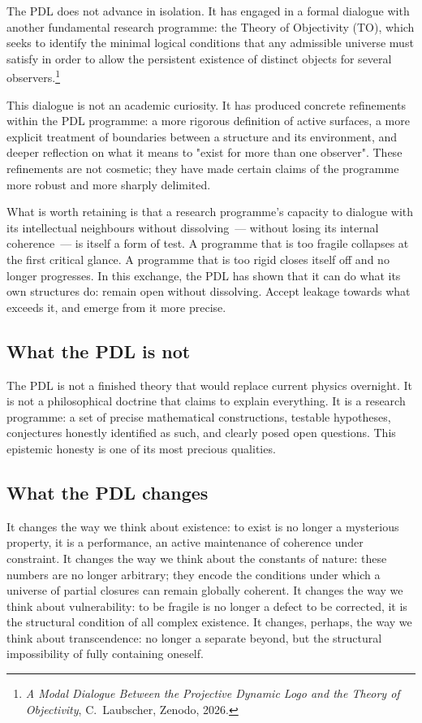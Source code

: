 \documentclass[12pt, a4paper, openright]{book}
\begin{document}
The PDL does not advance in isolation. It has engaged in a formal dialogue with another fundamental research programme: the Theory of Objectivity (TO), which seeks to identify the minimal logical conditions that any admissible universe must satisfy in order to allow the persistent existence of distinct objects for several observers.\footnote{\textit{A Modal Dialogue Between the Projective Dynamic Logo and the Theory of Objectivity}, C.~Laubscher, Zenodo, 2026.}

\medskip

This dialogue is not an academic curiosity. It has produced concrete refinements within the PDL programme: a more rigorous definition of active surfaces, a more explicit treatment of boundaries between a structure and its environment, and deeper reflection on what it means to "exist for more than one observer". These refinements are not cosmetic; they have made certain claims of the programme more robust and more sharply delimited.

\medskip

What is worth retaining is that a research programme's capacity to dialogue with its intellectual neighbours without dissolving~--- without losing its internal coherence~--- is itself a form of test. A programme that is too fragile collapses at the first critical glance. A programme that is too rigid closes itself off and no longer progresses. In this exchange, the PDL has shown that it can do what its own structures do: remain open without dissolving. Accept leakage towards what exceeds it, and emerge from it more precise.

\subsection*{What the PDL is not}

The PDL is not a finished theory that would replace current physics overnight. It is not a philosophical doctrine that claims to explain everything. It is a research programme: a set of precise mathematical constructions, testable hypotheses, conjectures honestly identified as such, and clearly posed open questions. This epistemic honesty is one of its most precious qualities.

\subsection*{What the PDL changes}

It changes the way we think about existence: to exist is no longer a mysterious property, it is a performance, an active maintenance of coherence under constraint. It changes the way we think about the constants of nature: these numbers are no longer arbitrary; they encode the conditions under which a universe of partial closures can remain globally coherent. It changes the way we think about vulnerability: to be fragile is no longer a defect to be corrected, it is the structural condition of all complex existence. It changes, perhaps, the way we think about transcendence: no longer a separate beyond, but the structural impossibility of fully containing oneself.
\end{document}
